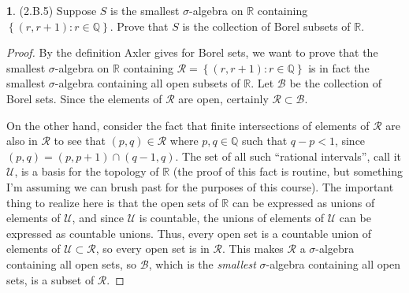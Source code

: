 \documentclass[12pt]{article}
\theoremstyle{definition}
\newtheorem{ex}{}
\begin{document}
\begin{ex}
	(2.B.5)
	Suppose $S$ is the smallest $\sigma$-algebra on $\mathbb{R}$ containing $\left\lbrace (r, r+1) : r \in \mathbb{Q} \right\rbrace$.
	Prove that $S$ is the collection of Borel subsets of $\mathbb{R}$.
\end{ex}
\begin{proof}
	By the definition Axler gives for Borel sets, we want to prove that the smallest $\sigma$-algebra on $\mathbb{R}$ containing $\mathcal{R} = \left\lbrace (r, r+1) : r \in \mathbb{Q} \right\rbrace$ is in fact the smallest $\sigma$-algebra containing all open subsets of $\mathbb{R}$.
	Let $\mathcal{B}$ be the collection of Borel sets.
	Since the elements of $\mathcal{R}$ are open, certainly $\mathcal{R} \subset \mathcal{B}$.

	On the other hand, consider the fact that finite intersections of elements of $\mathcal{R}$ are also in $\mathcal{R}$ to see that $(p, q) \in \mathcal{R}$ where $p, q \in \mathbb{Q}$ such that $q - p < 1$, since $(p, q) = (p, p + 1) \cap (q - 1, q)$.
	The set of all such ``rational intervals'', call it $\mathscr{U}$, is a basis for the topology of $\mathbb{R}$ (the proof of this fact is routine, but something I'm assuming we can brush past for the purposes of this course).
	The important thing to realize here is that the open sets of $\mathbb{R}$ can be expressed as unions of elements of $\mathscr{U}$, and since $\mathscr{U}$ is countable, the unions of elements of $\mathscr{U}$ can be expressed as countable unions.
	Thus, every open set is a countable union of elements of $\mathscr{U} \subset \mathcal{R}$, so every open set is in $\mathcal{R}$.
	This makes $\mathcal{R}$ a $\sigma$-algebra containing all open sets, so $\mathcal{B}$, which is the \textit{smallest} $\sigma$-algebra containing all open sets, is a subset of $\mathcal{R}$.
\end{proof}
\end{document}
